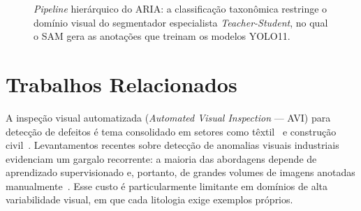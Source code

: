 \documentclass[10pt,conference]{IEEEtran}
\begin{document}
\begin{figure}[!t]
  \centering
  \caption{\textit{Pipeline} hierárquico do ARIA: a classificação taxonômica restringe o domínio visual do segmentador especialista \textit{Teacher-Student}, no qual o SAM gera as anotações que treinam os modelos YOLO11.}
  \label{fig:arquitetura}
\end{figure}

\section{Trabalhos Relacionados}

A inspeção visual automatizada (\textit{Automated Visual Inspection} --- AVI) para detecção de defeitos é tema consolidado em setores como têxtil~\cite{avi_textile_sikka2024} e construção civil~\cite{avi_concrete_waqar2024}. Levantamentos recentes sobre detecção de anomalias visuais industriais evidenciam um gargalo recorrente: a maioria das abordagens depende de aprendizado supervisionado e, portanto, de grandes volumes de imagens anotadas manualmente~\cite{avi_anomaly_li2025}. Esse custo é particularmente limitante em domínios de alta variabilidade visual, em que cada litologia exige exemplos próprios.
\end{document}
